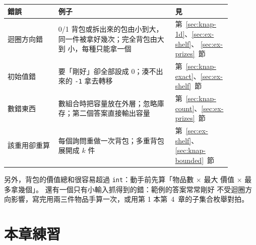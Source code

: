 \begin{center}
\begin{tabular}{p{0.2\linewidth}p{0.46\linewidth}>{\raggedright\arraybackslash}p{0.22\linewidth}}
\toprule
錯誤 & 例子 & 見 \\
\midrule
迴圈方向錯 & 0/1 背包或拆出來的包由小到大，同一件被拿好幾次；完全背包由大到
小，每種只能拿一個 & 第~\ref{sec:knap-1d}、\ref{sec:ex-shelf}、
\ref{sec:ex-prizes}~節 \\
初始值錯 & 要「剛好」卻全部設成 $0$；湊不出來的 \texttt{-1} 拿去轉移 &
第~\ref{sec:knap-exact}、\ref{sec:ex-shelf}~節 \\
數錯東西 & 數組合時把容量放在外層；忽略庫存；第二個答案直接輸出容量 &
第~\ref{sec:knap-count}、\ref{sec:ex-prizes}~節 \\
該重用卻重算 & 每個詢問重做一次背包；多重背包展開成 $k$ 件 &
第~\ref{sec:ex-shelf}、\ref{sec:knap-bounded}~節 \\
\bottomrule
\end{tabular}
\end{center}

另外，背包的價值總和很容易超過 \texttt{int}：動手前先算「物品數 $\times$ 最大
價值 $\times$ 最多拿幾個」。 還有一個只有小輸入抓得到的錯：範例的答案常常剛好
不受迴圈方向影響，寫完用兩三件物品手算一次，或用第 1 本第~4~章的子集合枚舉對拍。

\section{本章練習}
\label{sec:knap-exercises}

